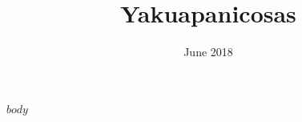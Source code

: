\documentclass{article}
\title{Yakuapanicosas}
\date{June 2018}
\begin{document}
\maketitle

$body$
\end{document}
